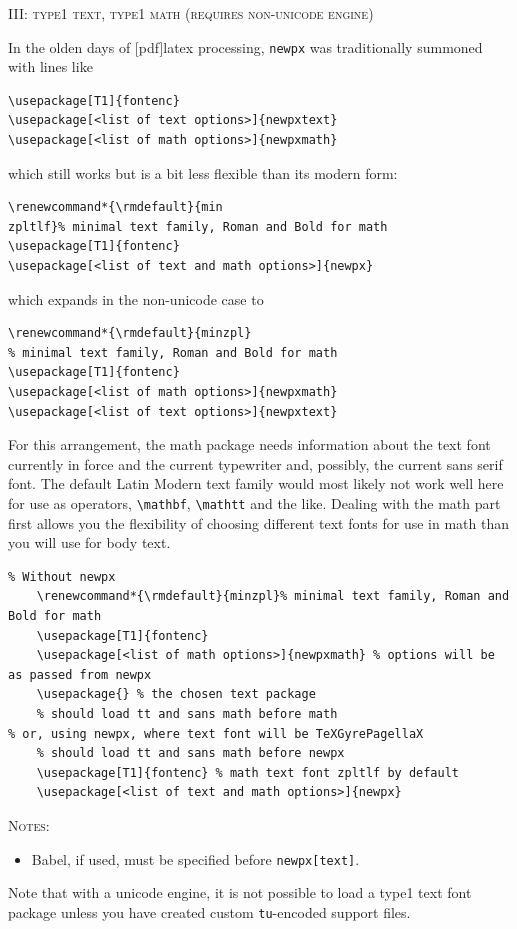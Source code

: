 \documentclass[11pt]{article}
\theoremstyle{oldplain}
\theoremstyle{plain}
\begin{document}
\textsc{III: type1 text, type1 math (requires non-unicode engine)}

In the olden days  of [pdf]latex processing, {\tt newpx} was traditionally summoned with lines like
\begin{verbatim}
\usepackage[T1]{fontenc}
\usepackage[<list of text options>]{newpxtext}
\usepackage[<list of math options>]{newpxmath}
\end{verbatim}
which still works but is a bit less flexible than its modern form:
\begin{verbatim}
\renewcommand*{\rmdefault}{min
zpltlf}% minimal text family, Roman and Bold for math
\usepackage[T1]{fontenc}
\usepackage[<list of text and math options>]{newpx}
\end{verbatim}
which expands in the non-unicode case to
\begin{verbatim}
\renewcommand*{\rmdefault}{minzpl}
% minimal text family, Roman and Bold for math
\usepackage[T1]{fontenc}
\usepackage[<list of math options>]{newpxmath}
\usepackage[<list of text options>]{newpxtext}
\end{verbatim}
For this arrangement, the math package needs information about the text font currently in force and the current typewriter and, possibly, the current sans serif font. The default Latin Modern text family would most likely not work well here for use as operators, \verb|\mathbf|, \verb|\mathtt| and the like. Dealing with the math part first allows you the flexibility of choosing different text fonts  for use in math than you will use for body text.
\begin{verbatim}
% Without newpx
    \renewcommand*{\rmdefault}{minzpl}% minimal text family, Roman and Bold for math
    \usepackage[T1]{fontenc}
    \usepackage[<list of math options>]{newpxmath} % options will be as passed from newpx
    \usepackage{} % the chosen text package
    % should load tt and sans math before math
% or, using newpx, where text font will be TeXGyrePagellaX
    % should load tt and sans math before newpx
    \usepackage[T1]{fontenc} % math text font zpltlf by default
    \usepackage[<list of text and math options>]{newpx} 
\end{verbatim}
\textsc{Notes:}
\begin{itemize}
\item Babel, if used, must be specified before {\tt newpx[text]}.
\end{itemize}

Note that with a unicode engine, it is not possible to load a type1 text font package unless you have created custom {\tt tu}-encoded support files.
\end{document}
